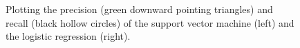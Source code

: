 \begin{figure}[t]
\centering
{}
\caption{Plotting the precision (green downward pointing triangles) and recall (black hollow circles) of the support vector machine (left) and the logistic regression (right).}
\label{fig:prediction}
\end{figure}

